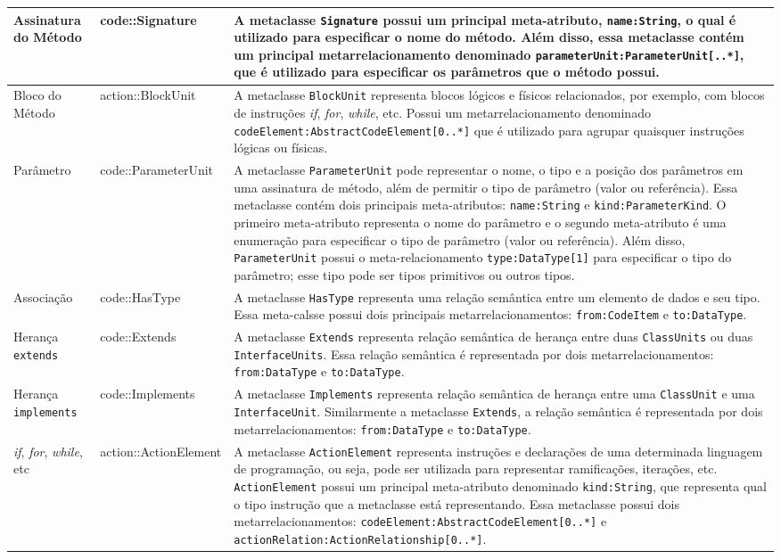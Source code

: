 \begin{longtable}[c]{| m{1.9cm} | m{3.57cm}| m{9.3cm} |}
\hline
Assinatura do Método & code::Signature & A metaclasse \texttt{Signature} possui um principal meta-atributo, \texttt{name:String}, o qual é utilizado para especificar o nome do método. Além disso, essa metaclasse contém um principal metarrelacionamento denominado \texttt{parameterUnit:ParameterUnit[..*]}, que é utilizado para especificar os parâmetros que o método possui.\\ 
\hline
Bloco do Método & action::BlockUnit & A metaclasse \texttt{BlockUnit} representa blocos lógicos e físicos relacionados, por exemplo, com blocos de instruções \textit{if}, \textit{for}, \textit{while}, etc. Possui um metarrelacionamento denominado \texttt{codeElement:AbstractCodeElement[0..*]} que é utilizado para agrupar quaisquer instruções lógicas ou físicas.\\ 
\hline
Parâmetro & code::ParameterUnit & A metaclasse \texttt{ParameterUnit} pode representar o nome, o tipo e a posição dos parâmetros em uma assinatura de método, além de permitir o tipo de parâmetro (valor ou referência). Essa metaclasse contém dois principais meta-atributos: \texttt{name:String} e \texttt{kind:ParameterKind}. O primeiro meta-atributo representa o nome do parâmetro e o segundo meta-atributo é uma enumeração para especificar o tipo de parâmetro (valor ou referência). Além disso, \texttt{ParameterUnit} possui o meta-relacionamento \texttt{type:DataType[1]} para especificar o tipo do parâmetro; esse tipo pode ser tipos primitivos ou outros tipos.\\ 
\hline
Associação & code::HasType & A metaclasse \texttt{HasType} representa uma relação semântica entre um elemento de dados e seu tipo. Essa meta-calsse possui dois principais metarrelacionamentos: \texttt{from:CodeItem} e \texttt{to:DataType}.\\ 
\hline
Herança \texttt{extends} & code::Extends & A metaclasse \texttt{Extends} representa relação semântica de herança entre duas \texttt{ClassUnits} ou duas \texttt{InterfaceUnits}. Essa relação semântica é representada por dois metarrelacionamentos: \texttt{from:DataType} e \texttt{to:DataType}.\\ 
\hline
Herança \texttt{implements} & code::Implements & A metaclasse \texttt{Implements} representa relação semântica de herança entre uma \texttt{ClassUnit} e uma \texttt{InterfaceUnit}. Similarmente a metaclasse \texttt{Extends}, a relação semântica é representada por dois metarrelacionamentos: \texttt{from:DataType} e \texttt{to:DataType}.\\ 
\hline
\textit{if}, \textit{for}, \textit{while}, etc & action::ActionElement & A metaclasse \texttt{ActionElement} representa instruções e declarações de uma determinada linguagem de programação, ou seja, pode ser utilizada para representar ramificações, iterações, etc. \texttt{ActionElement} possui um principal meta-atributo denominado \texttt{kind:String}, que representa qual o tipo instrução que a metaclasse está representando. Essa metaclasse possui dois metarrelacionamentos: \texttt{codeElement:AbstractCodeElement[0..*]} e \texttt{actionRelation:ActionRelationship[0..*]}.\\ 
\hline
 \end{longtable}

